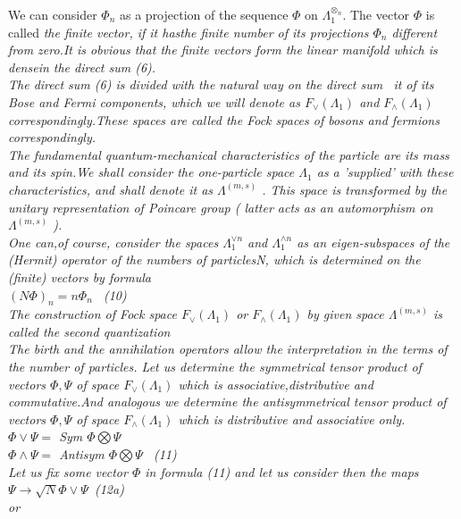 \documentclass[a4paper,12pt] {article}
\begin{document}
We can consider $\Phi_n$  as a projection of the sequence $\Phi$ on $ \Lambda_1^{\otimes_ n} $.
The vector $\Phi$  is called \it the  finite vector, \rm if it has\it  the finite number of its projections
 $\Phi_n$ \it different from zero.\rm  It is obvious that the finite vectors form the linear manifold which is
\it dense\rm  in the direct sum (6).\\ The direct sum (6) is divided with the natural way on the direct sum
\ it of its Bose and Fermi components, \rm which we will denote as
 $ F_\vee (\Lambda_1)$ and
$ F_\wedge (\Lambda_1) $ correspondingly.These spaces are called  \it the Fock spaces of bosons and
fermions \rm  correspondingly.\\ The fundamental quantum-mechanical characteristics of the particle are
\it  its mass and its spin.\rm We shall consider the one-particle space $\Lambda_1$ as a 'supplied'
with these  characteristics, and shall denote it as $\Lambda^ {(m,s)}$ .
This space is transformed by the unitary representation of Poincare group ( latter acts as an
\it automorphism \rm on $\Lambda^ {(m,s)}$  ).\\ One can,of course, consider the  spaces
$\Lambda_1^{\vee n} $  and  $\Lambda_1^{\wedge n} $  as an  \it eigen-subspaces of the
 (Hermit) operator of the numbers of particles\rm N, which is determined on the (finite) vectors by
 formula\\$ (N \Phi)_n = n \Phi_n $ \ (10) \\ \it The construction of Fock space  $ F_\vee (\Lambda_1)$  \it or
 $ F_\wedge (\Lambda_1)$ \it  by given space $\Lambda^{(m,s)} $  \it is called the second quantization\\ \rm The  birth and the annihilation  operators allow the interpretation  in the terms of the number of particles.
 Let us determine the symmetrical tensor product of vectors  $\Phi, \Psi$ of  space
$ F_\vee (\Lambda_1)$ which is  \it associative,distributive and commutative.\rm And analogous
 we determine the antisymmetrical  tensor product of vectors  $\Phi, \Psi$ of  space
 $ F_\wedge (\Lambda_1)$ which is  \it  distributive and associative only.
\\$ \Phi \vee \Psi = $ \rm Sym $ \Phi\bigotimes \Psi $ \\$\Phi \wedge \Psi =
$ \rm Antisym $ \Phi\bigotimes \Psi $ \rm \ (11)\\  Let us fix  some vector $\Phi$ in formula (11) and let us
 consider then the maps  \\$ \Psi \to \sqrt N \Phi \vee \Psi $\  (12a) \\or \\
\end{document}
